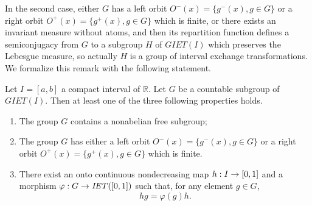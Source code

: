 \documentclass[AHL,Unicode,longabstracts,published]{cedram}
\newcommand{\R}{\mathbb{R}}
\newcounter{setofcase}
\newcounter{case}[setofcase]
\renewcommand*{\to}{\mathchoice{\longrightarrow}{\rightarrow}{\rightarrow}{\rightarrow}}
\newcommand{\R}{\mathbb{R}}
\begin{document}
In the second case, either $G$ has a left orbit $O^-(x)=\{g^-(x),g\in G\}$ or a right orbit $O^+(x)=\{g^+(x),g\in G\}$ which is finite, or there exists an invariant measure without atoms, and then its repartition function defines a semiconjugacy from $G$ to a subgroup $H$ of $\mathit{GIET}(I)$ which preserves the Lebesgue measure, so actually $H$ is a group of interval exchange transformations. We formalize this remark with the following statement.



\begin{coro}
Let $I=[a,b]$ a compact interval of $\R$. Let $G$ be a countable subgroup of $\mathit{GIET}(I)$. Then at least one of the three following properties holds.
\begin{enumerate}
\item\label{coro1.11.1} The group $G$ contains a nonabelian free subgroup;
\item\label{coro1.11.2} The group $G$ has either a left orbit $O^-(x)=\{g^-(x),g\in G\}$ or a right orbit $O^+(x)=\{g^+(x),g\in G\}$ which is finite.
\item\label{coro1.11.3} There exist an onto continuous nondecreasing map $h : I \to [0,1]$ and a morphism $\varphi : G \to \mathit{IET}([0,1])$ such that, for any element $g \in G$,
\[
hg=\varphi(g)h.
\]
\end{enumerate}
\end{coro}
\end{document}
